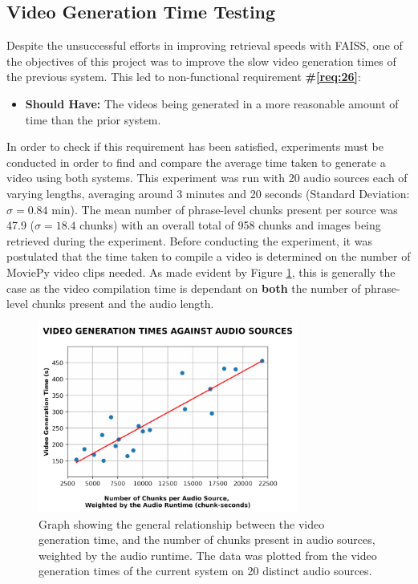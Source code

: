 \documentclass{l4proj}
\begin{document}
\subsection{Video Generation Time Testing}
\label{sec:video_generation_time}
Despite the unsuccessful efforts in improving retrieval speeds with FAISS, one of the objectives of this project was to improve the slow video generation times of the previous system. This led to non-functional requirement \textbf{\#\ref{req:26}}:

\begin{itemize}
    \item \textbf{Should Have:} The videos being generated in a more reasonable amount of time than the prior system.
\end{itemize}

In order to check if this requirement has been satisfied, experiments must be conducted in order to find and compare the average time taken to generate a video using both systems. This experiment was run with 20 audio sources each of varying lengths, averaging around 3 minutes and 20 seconds (Standard Deviation: $\sigma = 0.84$ min). The mean number of phrase-level chunks present per source was 47.9 ($\sigma = 18.4$ chunks) with an overall total of 958 chunks and images being retrieved during the experiment. Before conducting the experiment, it was postulated that the time taken to compile a video is determined on the number of MoviePy video clips needed. As made evident by Figure \ref{fig:videography_against_wchunks}, this is generally the case as the video compilation time is dependant on \textbf{both} the number of phrase-level chunks present and the audio length.

\begin{figure}[H]
    \centering
    \includegraphics[width=0.76\textwidth]{figures/video_generation_against_wchunks.pdf}
    \caption{Graph showing the general relationship between the video generation time, and the number of chunks present in audio sources, weighted by the audio runtime. The data was plotted from the video generation times of the current system on 20 distinct audio sources.}
    \label{fig:videography_against_wchunks}
\end{figure}
\end{document}
